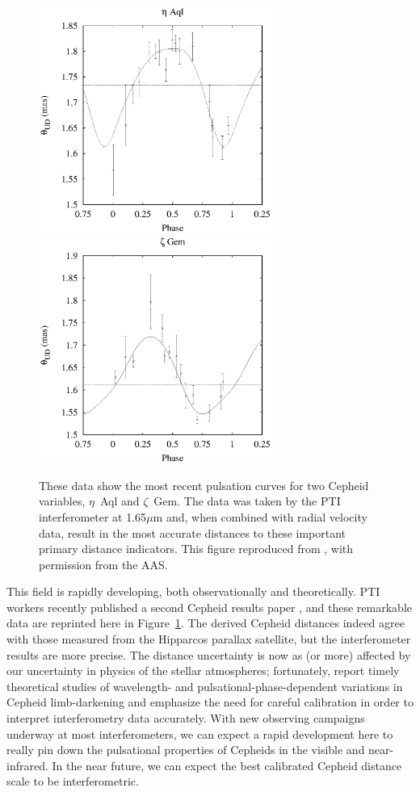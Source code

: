 \documentclass[12pt]{iopart}
\begin{document}
\begin{figure}[tbhp]
\begin{center}
\includegraphics[clip,angle=0,width=3.0in]{Figures/JDM_lane1a.eps}
\includegraphics[clip,angle=0,width=3.0in]{Figures/JDM_lane1b.eps}
\caption{\footnotesize 
These data show the most recent pulsation curves for
two Cepheid variables, $\eta$~Aql and $\zeta$~Gem.  
The data was taken by the PTI interferometer at 1.65$\mu$m
and, when  combined with radial velocity data, result in the most
accurate distances to these important primary distance indicators.
This figure reproduced from \citet[][see Figure 1]{lane2002a}, with
permission from the AAS.
\label{cepheids}}
\end{center}
\end{figure}

This field is rapidly developing, both observationally and
theoretically.  PTI workers recently published a second Cepheid
results paper \citep{lane2002a}, and these remarkable data are
reprinted here in Figure~\ref{cepheids}.  The derived Cepheid
distances indeed agree with those measured from the Hipparcos parallax
satellite, but the interferometer results are more precise.  The
distance uncertainty is now as (or more) affected by our uncertainty
in physics of the stellar atmospheres; fortunately,
\citet{marengo2002} report timely theoretical studies of wavelength-
and pulsational-phase-dependent variations in Cepheid limb-darkening
and emphasize the need for careful calibration in order to interpret
interferometry data accurately.  With new observing campaigns underway
at most interferometers, we can expect a rapid development here to
really pin down the pulsational properties of Cepheids in the visible
and near-infrared. In the near future, we can expect the best
calibrated Cepheid distance scale to be interferometric.
\end{document}

